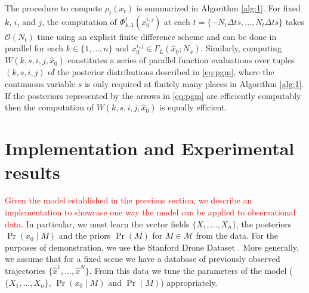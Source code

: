 \documentclass[letterpaper,10pt,conference]{ieeeconf}
\newtheorem{thm}{Theorem}
\newcommand{\rtext}[1]{\textcolor{red}{#1}}
\begin{document}
The procedure to compute  $\rho_t(x_t)$ is summarized in Algorithm \ref{alg:1}.
For fixed $k$, $i$, and $j$, the computation of $\Phi_{k,1}^t(x_0^{i,j})$ at each $t = \{-N_t \Delta t \bar{s} ,\dots, N_t \Delta t \bar{s}\}$ takes $\mathcal{O}(N_t)$ time using an explicit finite difference scheme and can be done in parallel for each $k \in \{1,\dots, n\}$ and $x_0^{i,j} \in \Gamma_L( \hat{x}_0; N_x)$.
Similarly, computing $W(k,s,i,j,\hat{x}_0)$ constitutes a series of parallel function evaluations over tuples $(k,s,i,j)$ of the posterior distributions described in \eqref{eq:pgm}, where the continuous variable $s$ is only required at finitely many places in Algorithm \ref{alg:1}.
If the posteriors represented by the arrows in \eqref{eq:pgm} are efficiently computably then the computation of $W(k,s,i,j, \hat{x}_0)$ is equally efficient.
  
\section{Implementation and Experimental results} \label{sec:implementation}
  \rtext{Given the model established in the previous section, we describe an implementation to showcase one way the model can be applied to observational data.}
  In particular, we must learn the vector fields $\{X_1, \dots, X_n\}$, the posteriors $\Pr( x_0 \mid M)$ and the priors $\Pr(M)$ for $M \in \mathcal{M}$ from the data.
  For the purposes of demonstration, we use the Stanford Drone Dataset \cite{Robicquet2016}.
  More generally, we assume that for a fixed scene we have a database of previously observed trajectories $\{ \hat{x}^1, \dots, \hat{x}^N\}$.
  From this data we tune the parameters of the model ($\{X_1, \dots, X_n\}$, $\Pr( x_0 \mid M)$ and $\Pr(M)$)  appropriately.
  
\end{document}
